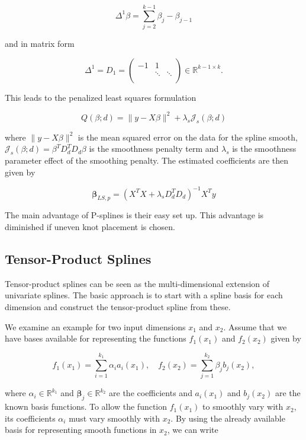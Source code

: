 \documentclass[10pt,a4paper]{article}
\begin{document}
$$\Delta^1 \beta = \sum_{j=2}^{k-1} \beta_{j} - \beta_{j-1}$$

and in matrix form

$$\Delta^1 = D_1 = \begin{pmatrix} -1 & 1 \\ & \ddots & \ddots \\   \end{pmatrix} \in \mathbb{R}^{k-1 \times k}.$$

This leads to the penalized least squares formulation

$$Q(\beta; d) = \lVert y - X\beta\rVert^2 + \lambda_s \mathcal J_s(\beta;d)$$

where $\lVert y - X\beta \rVert^2$ is the mean squared error on the data for the spline smooth, $\mathcal J_s(\beta;d) = \beta^T D_d^T D_d \beta$ is the smoothness penalty term and $\lambda_s$ is the smoothness parameter effect of the smoothing penalty. The estimated coefficients are then given by

$$\boldsymbol{\beta}_{LS,p} = (X^TX + \lambda_s D_d^T D_d)^{-1}X^Ty$$

The main advantage of P-splines is their easy set up. This advantage is diminished if uneven knot placement is chosen. 

\subsection{Tensor-Product Splines}

Tensor-product splines can be seen as the multi-dimensional extension of univariate splines. The basic approach is to start with a spline basis for each dimension and construct the tensor-product spline from these. 

We examine an example for two input dimensions $x_1$ and $x_2$. Assume that we have bases available for representing the functions $f_1(x_1)$ and $f_2(x_2)$ given by

$$f_1(x_1) = \sum_{i=1}^{k_1} \alpha_i a_i(x_1), \quad f_2(x_2) = \sum_{j=1}^{k_2} \beta_j b_j(x_2),$$

where $\alpha_i \in \mathbb{R}^{k_1}$ and $\boldsymbol{\beta}_j \in \mathbb{R}^{k_2}$ are the coefficients and $a_i(x_1)$ and $b_j(x_2)$ are the known basis functions. To allow the function $f_1(x_1)$ to smoothly vary with $x_2$, its coefficients $\alpha_i$ must vary smoothly with $x_2$. By using the already available basis for representing smooth functions in $x_2$, we can write
\end{document}
